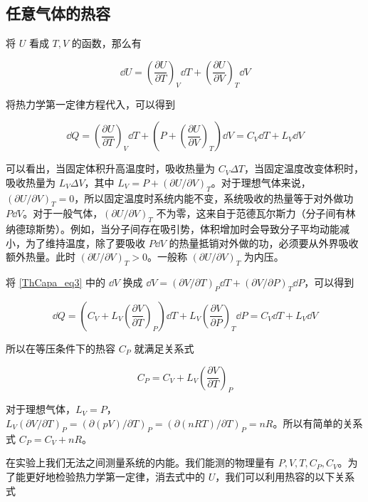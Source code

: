\subsection{任意气体的热容}
将 $U$ 看成 $T,V$ 的函数，那么有

\begin{equation}
\dd U=\left(\frac{\partial U}{\partial T}\right)_V\dd T+\left(\frac{\partial U}{\partial V}\right)_T\dd V
\end{equation}

将热力学第一定律方程代入，可以得到

\begin{equation}\label{ThCapa_eq3}
\dd Q=\left(\frac{\partial U}{\partial T}\right)_V\dd T+\left(P+\left(\frac{\partial U}{\partial V}\right)_T\right)\dd V
=C_V \dd T+L_V \dd V 
\end{equation}

可以看出，当固定体积升高温度时，吸收热量为 $C_V\Delta T$，当固定温度改变体积时，吸收热量为 $L_V\Delta V$，其中 $L_V=P+(\partial U/\partial V)_T$。对于理想气体来说， $(\partial U/\partial V)_T=0$，所以固定温度时系统内能不变，系统吸收的热量等于对外做功 $P\dd V$。对于一般气体，$(\partial U/\partial V)_T$ 不为零，这来自于范德瓦尔斯力（分子间有林纳德琼斯势）。例如，当分子间存在吸引势，体积增加时会导致分子平均动能减小，为了维持温度，除了要吸收 $P\dd V$ 的热量抵销对外做的功，必须要从外界吸收额外热量。此时 $(\partial U/\partial V)_T>0$。一般称 $(\partial U/\partial V)_T$ 为内压。

将 \autoref{ThCapa_eq3} 中的 $\dd V$ 换成 $\dd V=(\partial V/\partial T)_P\dd T+(\partial V/\partial P)_T\dd P$，可以得到

\begin{equation}
\dd Q=\left(C_V+L_V\left(\frac{\partial V}{\partial T}\right)_P\right)\dd T+L_V\left(\frac{\partial V}{\partial P}\right)_T\dd P
=C_V \dd T+L_V \dd V 
\end{equation}

所以在等压条件下的热容 $C_P$ 就满足关系式

\begin{equation}
C_P=C_V+L_V\left(\frac{\partial V}{\partial T}\right)_P
\end{equation}

对于理想气体，$L_V=P$，$L_V(\partial V/\partial T)_P=(\partial (pV)/\partial T)_P=(\partial (nRT)/\partial T)_P=nR$。所以有简单的关系式 $C_P=C_V+nR$。

在实验上我们无法之间测量系统的内能。我们能测的物理量有 $P,V,T,C_P,C_V$。为了能更好地检验热力学第一定律，消去式中的 $U$，我们可以利用热容的以下关系式

